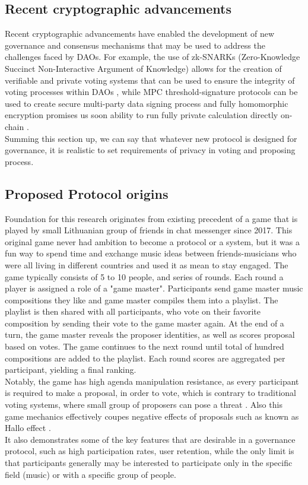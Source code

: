 \documentclass{article}
\begin{document}
\begin{CJK}{UTF8}{gbsn}
\begin{multicols}{2}
        \subsection{Recent cryptographic advancements}
        Recent cryptographic advancements have enabled the development of new governance and consensus mechanisms that may be used to address the challenges faced by DAOs. For example, the use of zk-SNARKs (Zero-Knowledge Succinct Non-Interactive Argument of Knowledge) allows for the creation of verifiable and private voting systems that can be used to ensure the integrity of voting processes within DAOs \cite{Ben-Sasson2014}, while MPC threshold-signature protocols can be used to create secure multi-party data signing process \cite{Doerner2023} and fully homomorphic encryption promises us soon ability to run fully private calculation directly on-chain \cite{Fhenix}.\\
        Summing this section up, we can say that whatever new protocol is designed for governance, it is realistic to set requirements of privacy in voting and proposing process.

        \subsection{Proposed Protocol origins}\label{sec:protocol_origins}
        Foundation for this research originates from existing precedent of a game that is played by small Lithuanian group of friends in chat messenger since 2017. This original game never had ambition to become a protocol or a system, but it was a fun way to spend time and exchange music ideas between friends-musicians who were all living in different countries and used it as mean to stay engaged. The game typically consists of 5 to 10 people, and series of rounds. Each round a player is assigned a role of a "game master". Participants send game master music compositions they like and game master compiles them into a playlist. The playlist is then shared with all participants, who vote on their favorite composition by sending their vote to the game master again. At the end of a turn, the game master reveals the proposer identities, as well as scores proposal based on votes. The game continues to the next round until total of hundred compositions are added to the playlist. Each round scores are aggregated per participant, yielding a final ranking.\\
        Notably, the game has high agenda manipulation resistance, as every participant is required to make a proposal, in order to vote, which is contrary to traditional voting systems, where small group of proposers can pose a threat  \cite{McKelvey1976}. Also this game mechanics effectively coupes negative effects of proposals such as known as Hallo effect \cite{Verhulst2010}. \\
        It also demonstrates some of the key features that are desirable in a governance protocol, such as high participation rates, user retention, while the only limit is that participants generally may be interested to participate only in the specific field (music) or with a specific group of people.


\end{multicols}
\end{CJK}
\end{document}
